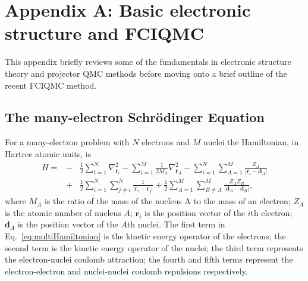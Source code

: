 \chapter{Appendix A: Basic electronic structure and FCIQMC}
\label{ch:appendix1}
\ifpdf
    \graphicspath{{Appendix1/Appendix1Figs/PNG/}{Chapter1/Appendix1Figs/PDF/}{Appendix1/Appendix1Figs/}}
\else
    \graphicspath{{Appendix1/Appendix1Figs/EPS/}{Appendix1/Appendix1Figs/}}
\fi
This appendix briefly reviews some of the fundamentals in electronic structure theory and projector QMC methods before moving onto a brief outline of the recent FCIQMC method.

\section*{The many-electron Schr\"{o}dinger Equation}
For a many-electron problem with $N$ electrons and $M$ nuclei the Hamiltonian, in Hartree atomic units, is
\begin{eqnarray}
\label{eq:multiHamiltonian}
 H = 
&-&\frac{1}{2}\sum_{i=1}^N \nabla_{\textbf{r}_i}^2
-\sum_{i=1}^M \frac{1}{2M_{A}} \nabla_{\textbf{r}_A}^2
-\sum_{i=1}^N \sum_{A=1}^M \frac{Z_A}{\lvert \textbf{r}_i-\textbf{d}_A\rvert}\nonumber\\
&+&\frac{1}{2}\sum_{i=1}^N \sum_{j\neq i}^N \frac{1}{\lvert \textbf{r}_i-\textbf{r}_j\rvert}
+\frac{1}{2}\sum_{A=1}^M \sum_{B\neq A}^M \frac{Z_AZ_B}{\lvert \textbf{d}_A-\textbf{d}_B\rvert},
\end{eqnarray}
where $M_A$ is the ratio of the mass of the nucleus A to the mass of an electron; $Z_A$ is the atomic number of nucleus $A$; $\textbf{r}_i$ is the position vector of the $i$th electron;  $\textbf{d}_A$ is the position vector of the $A$th nuclei. The first term in Eq.~\ref{eq:multiHamiltonian} is the kinetic energy operator of the electrons; the second term is the kinetic energy operator of the nuclei; the third term represents the electron-nuclei coulomb attraction; the fourth and fifth terms represent the electron-electron and nuclei-nuclei coulomb repulsions respectively. 

